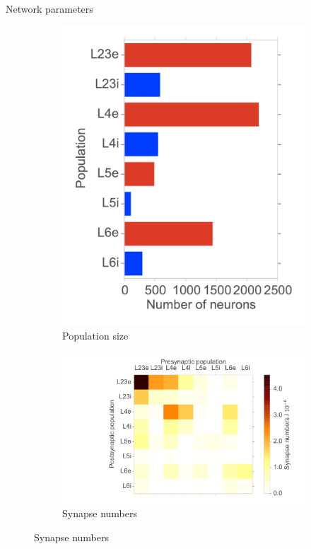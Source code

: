 \documentclass[xcolor=x11names,compress]{beamer}
\renewcommand{\(}{\begin{columns}}
\renewcommand{\)}{\end{columns}}
\newcommand{\<}[1]{\begin{column}{#1}}
\renewcommand{\>}{\end{column}}
\begin{document}
\begin{frame}[t]{Network parameters}
\begin{figure}
    \centering
    \begin{subfigure}[b]{0.31\textwidth}
        \includegraphics[width=\textwidth]{../figures/population_sizes}
        \caption{Population size}
        \label{fig:pop_size}
    \end{subfigure}
    \quad
    \begin{subfigure}[b]{0.64\textwidth}
        \includegraphics[width=\textwidth]{../figures/heat_map_syn_numbers}
        \caption{Synapse numbers}
        \label{fig:syn_numbers}
    \end{subfigure}
\end{figure}
\end{frame}
\end{document}
